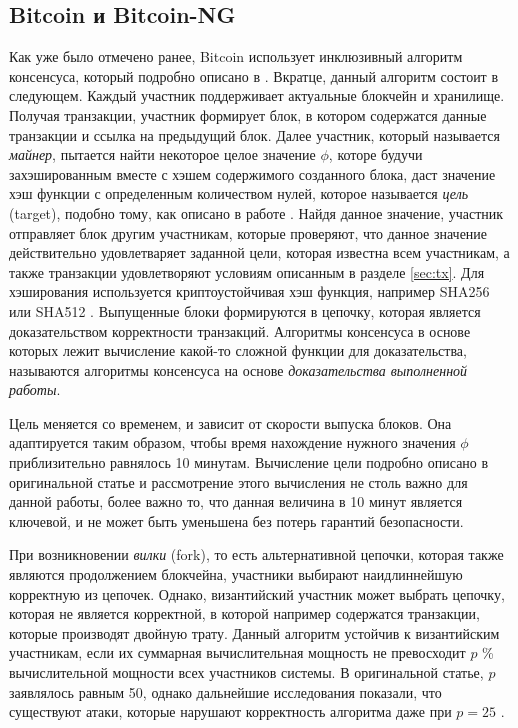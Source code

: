 \subsection{Bitcoin и Bitcoin-NG}
Как уже было отмечено ранее, Bitcoin использует инклюзивный алгоритм консенсуса, который подробно описано в \cite{nakamoto}. Вкратце, данный алгоритм состоит в следующем.
Каждый участник поддерживает актуальные блокчейн и хранилище. Получая транзакции, участник формирует блок, в котором содержатся данные транзакции и ссылка на предыдущий блок. Далее участник, который называется \textit{майнер}, пытается найти некоторое целое значение $\phi$, которе будучи захэшированным вместе с хэшем содержимого созданного блока, даст значение хэш функции с определенным количеством нулей, которое называется \textit{цель} (target), подобно тому, как описано в работе \cite{hashcash}. Найдя данное значение, участник отправляет блок другим участникам, которые проверяют, что данное значение действительно удовлетваряет заданной цели, которая известна всем участникам, а также транзакции удовлетворяют условиям описанным в разделе \ref{sec:tx}. Для хэширования используется криптоустойчивая хэш функция, например SHA256 или SHA512 \cite{sha-2}.
Выпущенные блоки формируются в цепочку, которая является доказательством корректности транзакций. Алгоритмы консенсуса в основе которых лежит вычисление какой-то сложной функции для доказательства, называются  алгоритмы консенсуса на основе \textit{доказательства выполненной работы}\cite{pow}.

Цель меняется со временем, и зависит от скорости выпуска блоков. Она адаптируется таким образом, чтобы время нахождение нужного значения $\phi$  приблизительно равнялось 10 минутам. Вычисление цели подробно описано в оригинальной статье \cite{nakamoto} и рассмотрение этого вычисления не столь важно для данной работы, более важно то, что данная величина в 10 минут является ключевой, и не может быть уменьшена без потерь гарантий безопасности.

При возникновении \textit{вилки} (fork), то есть альтернативной цепочки, которая также являются продолжением блокчейна, участники выбирают наидлиннейшую корректную из цепочек. Однако, византийский участник может выбрать цепочку, которая не является корректной, в которой например содержатся транзакции, которые производят двойную трату. Данный алгоритм устойчив к византийским участникам, если их суммарная вычислительная мощность не превосходит $p$ \% вычислительной мощности всех участников системы. В оригинальной статье, $p$ заявлялось равным 50, однако дальнейшие исследования показали, что существуют атаки, которые нарушают корректность алгоритма даже при $p=25$ \cite{DBLP:journals/corr/EyalS13}.

